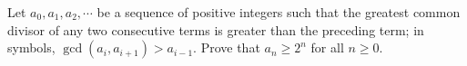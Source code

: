 %
%
%
%

\begin{problem}
	Let $ a_0, a_1, a_2, \cdots$ be a sequence of positive integers such that the greatest common divisor of any two consecutive terms is greater than the preceding term; in symbols, $ \gcd (a_i, a_{i+ 1}) > a_{i - 1}$. Prove that $ a_n\ge 2^n$ for all $ n\ge 0$. %
\end{problem}

